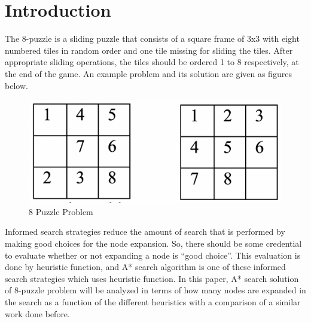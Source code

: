 \documentclass[12pt]{report}
\begin{document}
\section{Introduction}
The 8-puzzle is a sliding puzzle that consists of a square
frame of 3x3 with eight numbered tiles in random order and
one tile missing for sliding the tiles. After appropriate
sliding operations, the tiles should be ordered 1 to 8
respectively, at the end of the game. An example problem
and its solution are given as figures below.
\begin{figure}[h]
    \begin{center}
     \includegraphics[scale=0.5]{figures/state.png}
    \end{center}
    \caption{8 Puzzle Problem}
\end{figure}
\newline Informed search strategies reduce the amount of search that
is performed by making good choices for the node
expansion. So, there should be some credential to evaluate
whether or not expanding a node is “good choice”. This
evaluation is done by heuristic function, and A* search
algorithm is one of these informed search strategies which
uses heuristic function. In this paper, A* search solution of
8-puzzle problem will be analyzed in terms of how many
nodes are expanded in the search as a function of the
different heuristics with a comparison of a similar work
done before.
\end{document}

